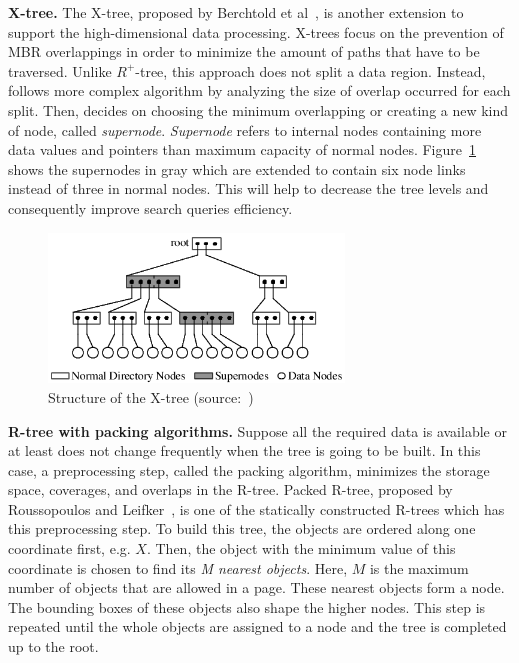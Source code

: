 \documentclass[a4paper,12pt]{article}
\begin{document}
\textbf{X-tree.}
The X-tree, proposed by Berchtold et al~\cite{xtree}, is another extension to support the high-dimensional data processing. X-trees focus on the prevention of MBR overlappings in order to minimize the amount of paths that have to be traversed. Unlike $R^+$-tree, this approach does not split a data region. Instead, follows more complex algorithm by analyzing the size of overlap occurred for each split. Then, decides on choosing the minimum overlapping or creating a new kind of node, called \textit{supernode}. \textit{Supernode} refers to internal nodes containing more data values and pointers than maximum capacity of normal nodes. Figure~\ref{figxtree} shows the supernodes in gray which are extended to contain six node links instead of three in normal nodes. This will help to decrease the tree levels and consequently improve search queries efficiency.

\begin{figure}
\centering
\includegraphics[width=0.7\textwidth]{xtree}
\caption{Structure of the X-tree (source:~\cite{xtree})}
\label{figxtree}
\end{figure}


\textbf{R-tree with packing algorithms.}
Suppose all the required data is available or at least does not change frequently when the tree is going to be built.
In this case, a preprocessing step, called the packing algorithm, minimizes the storage space, coverages, and overlaps in the R-tree.
Packed R-tree, proposed by Roussopoulos and Leifker~\cite{packedrtree, packedrtree2}, is one of the statically constructed R-trees which has this preprocessing step. To build this tree, the objects are ordered along one coordinate first, e.g. $X$. Then, the object with the minimum value of this coordinate is chosen to find its \textit{M nearest objects}. Here, $M$ is the maximum number of objects that are allowed in a page. These nearest objects form a node. The bounding boxes of these objects also shape the higher nodes. This step is repeated until the whole objects are assigned to a node and the tree is completed up to the root.
\end{document}

